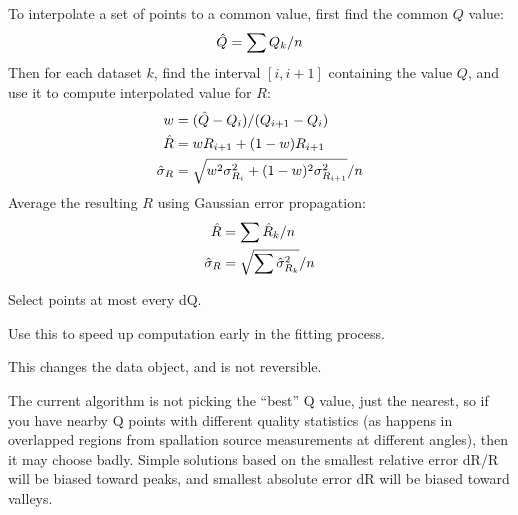 \documentclass[letterpaper,10pt,english]{sphinxmanual}
\begin{document}
\begin{fulllineitems}
\begin{fulllineitems}
To interpolate a set of points to a common value, first find the
common $Q$ value:
\begin{gather}
\begin{split}\hat Q = \sum{Q_k} / n\end{split}\notag
\end{gather}
Then for each dataset $k$, find the interval $[i,i+1]$ containing the
value $Q$, and use it to compute interpolated value for $R$:
\begin{gather}
\begin{split}w &= (\hat Q - Q_i)/(Q_{i+1} - Q_i) \\
\hat R &= w R_{i+1} + (1-w) R_{i+1} \\
\hat \sigma_{R} &=
    \sqrt{ w^2 \sigma^2_{R_i} + (1-w)^2 \sigma^2_{R_{i+1}} } / n\end{split}\notag
\end{gather}
Average the resulting $R$ using Gaussian error propagation:
\begin{gather}
\begin{split}\hat R &= \sum{\hat R_k}/n \\
\hat \sigma_R &= \sqrt{\sum \hat \sigma_{R_k}^2}/n\end{split}\notag
\end{gather}
\end{fulllineitems}


\begin{fulllineitems}
\label{api/probe:refl1d.probe.ProbeSet.subsample}
Select points at most every dQ.

Use this to speed up computation early in the fitting process.

This changes the data object, and is not reversible.

The current algorithm is not picking the ``best'' Q value, just the
nearest, so if you have nearby Q points with different quality
statistics (as happens in overlapped regions from spallation
source measurements at different angles), then it may choose
badly.  Simple solutions based on the smallest relative error dR/R
will be biased toward peaks, and smallest absolute error dR will
be biased toward valleys.

\end{fulllineitems}



\end{fulllineitems}
\end{document}
